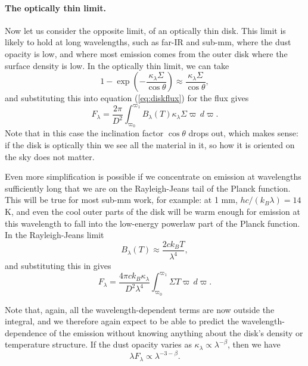 \paragraph{The optically thin limit.}

Now let us consider the opposite limit, of an optically thin disk. This limit is likely to hold at long wavelengths, such as far-IR and sub-mm, where the dust opacity is low, and where most emission comes from the outer disk where the surface density is low. In the optically thin limit, we can take
\begin{equation}
1-\exp\left(-\frac{\kappa_{\lambda}\Sigma}{\cos\theta}\right) \approx \frac{\kappa_{\lambda}\Sigma}{\cos\theta},
\end{equation}
and substituting this into equation (\ref{eq:diskflux}) for the flux gives
\begin{equation}
F_{\lambda} = \frac{2\pi}{D^2} \int_{\varpi_0}^{\varpi_1} B_{\lambda}(T) \kappa_{\lambda}\Sigma \varpi\,d\varpi.
\end{equation}
Note that in this case the inclination factor $\cos\theta$ drops out, which makes sense: if the disk is optically thin we see all the material in it, so how it is oriented on the sky does not matter.

Even more simplification is possible if we concentrate on emission at wavelengths sufficiently long that we are on the Rayleigh-Jeans tail of the Planck function. This will be true for most sub-mm work, for example: at 1 mm, $hc/(k_B\lambda) = 14$ K, and even the cool outer parts of the disk will be warm enough for emission at this wavelength to fall into the low-energy powerlaw part of the Planck function. In the Rayleigh-Jeans limit
\begin{equation}
B_{\lambda}(T) \approx \frac{2c k_B T}{\lambda^4},
\end{equation}
and substituting this in gives
\begin{equation}
F_{\lambda} = \frac{4\pi c k_B \kappa_{\lambda}}{D^2\lambda^4} \int_{\varpi_0}^{\varpi_1} \Sigma T \varpi \,d\varpi.
\end{equation}

Note that, again, all the wavelength-dependent terms are now outside the integral, and we therefore again expect to be able to predict the wavelength-dependence of the emission without knowing anything about the disk's density or temperature structure. If the dust opacity varies as $\kappa_\lambda\propto \lambda^{-\beta}$, then we have
\begin{equation}
\lambda F_\lambda \propto \lambda^{-3-\beta}.
\end{equation}

